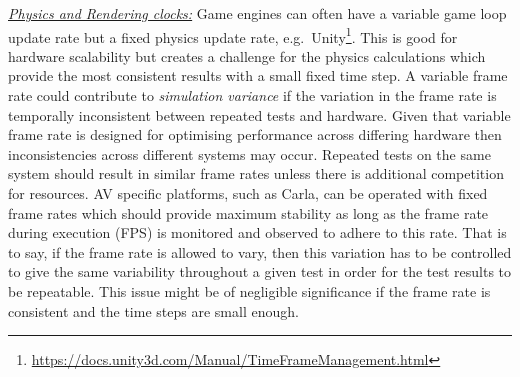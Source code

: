 \documentclass[letterpaper, 10 pt, journal, twoside]{IEEEtran}
\begin{document}
%
%
\noindent\underline{\textit{Physics and Rendering clocks:}}
Game engines can often have a variable game loop update rate but a fixed physics update rate, e.g.\ Unity\footnote{\url{https://docs.unity3d.com/Manual/TimeFrameManagement.html}}. This is good for hardware scalability but creates a challenge for the physics calculations which provide the most consistent results with a small fixed time step. 
%
A variable frame rate could contribute to \textit{simulation variance} if the variation in the frame rate is temporally inconsistent between repeated tests and hardware. Given that variable frame rate is designed for optimising performance across differing hardware then inconsistencies across different systems may occur. Repeated tests on the same system should result in similar frame rates unless there is additional competition for resources. 
%
AV specific platforms, such as Carla, can be operated with fixed frame rates which should provide maximum stability as long as the frame rate during execution (FPS) is monitored and observed to adhere to this rate.
%
That is to say, if the frame rate is allowed to vary, then this variation has to be controlled to give the same variability throughout a given test in order for the test results to be repeatable. This issue might be of negligible significance if the frame rate is consistent and the time steps are small enough. 
\end{document}

